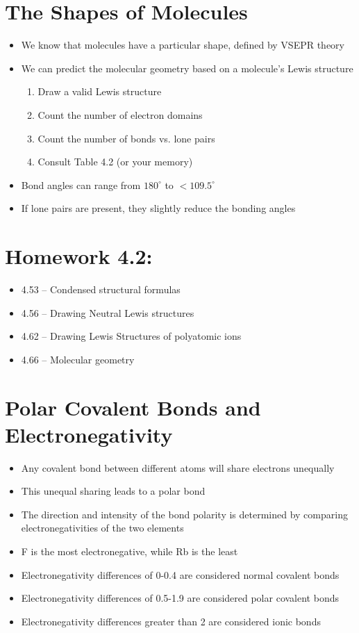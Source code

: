 \documentclass[12pt, openany, letterpaper]{memoir}
\begin{document}
\section{The Shapes of Molecules}
\begin{itemize}
	\item We know that molecules have a particular shape, defined by VSEPR theory
	\item We can predict the molecular geometry based on a molecule's Lewis structure
	      \begin{enumerate}
		      \item Draw a valid Lewis structure
		      \item Count the number of electron domains
		      \item Count the number of bonds vs. lone pairs
		      \item Consult Table 4.2 (or your memory)
	      \end{enumerate}
	\item Bond angles can range from $180^\circ$ to $<109.5^\circ$
	\item If lone pairs are present, they slightly reduce the bonding angles
\end{itemize}

\section*{Homework 4.2:}
\begin{itemize}
  \item 4.53 -- Condensed structural formulas
  \item 4.56 -- Drawing Neutral Lewis structures
  \item 4.62 -- Drawing Lewis Structures of polyatomic ions
  \item 4.66 -- Molecular geometry
\end{itemize}

\section{Polar Covalent Bonds and Electronegativity}
\begin{itemize}
	\item Any covalent bond between different atoms will share electrons unequally
	\item This unequal sharing leads to a polar bond
	\item The direction and intensity of the bond polarity is determined by comparing electronegativities of the two elements
	\item F is the most electronegative, while Rb is the least
	\item Electronegativity differences of 0-0.4 are considered normal covalent bonds
	\item Electronegativity differences of 0.5-1.9 are considered polar covalent bonds
	\item Electronegativity differences greater than 2 are considered ionic bonds
\end{itemize}
\end{document}
